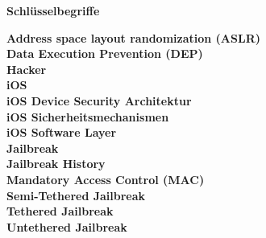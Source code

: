 %
%
% 
% 
% 

\begin{center}
{\Large\bfseries Schlüsselbegriffe}
\end{center}

\noindent
\textbf{Address space layout randomization (ASLR)} \\
\textbf{Data Execution Prevention (DEP)} \\
\textbf{Hacker} \\
\textbf{iOS} \\
\textbf{iOS Device Security Architektur} \\
\textbf{iOS Sicherheitsmechanismen} \\
\textbf{iOS Software Layer} \\
\textbf{Jailbreak} \\
\textbf{Jailbreak History} \\
\textbf{Mandatory Access Control (MAC)} \\
\textbf{Semi-Tethered Jailbreak} \\
\textbf{Tethered Jailbreak } \\
\textbf{Untethered Jailbreak } \\



